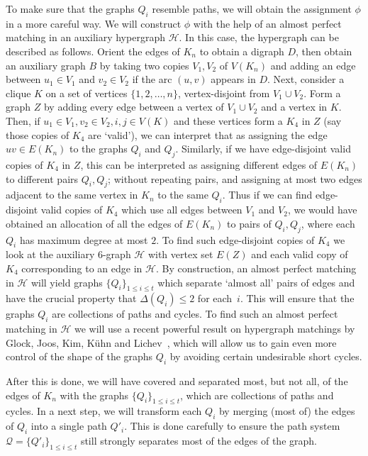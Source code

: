 \documentclass[a4paper, 11pt,reqno]{amsart}
\theoremstyle{plain}
\theoremstyle{definition}
\numberwithin{equation}{section}
\begin{document}
To make sure that the graphs $Q_i$ resemble paths, we will obtain the
assignment $\phi$ in a more careful way.  We will construct $\phi$
with the help of an almost perfect matching in an auxiliary hypergraph
$\mathcal{H}$.  In this case, the hypergraph can be described as
follows.  Orient the edges of $K_n$ to obtain a digraph $D$, then
obtain an auxiliary graph $B$ by taking two copies $V_1, V_2$ of
$V(K_n)$ and adding an edge between $u_1 \in V_1$ and $v_2 \in V_2$ if
the arc $(u,v)$ appears in $D$.
Next, consider a clique $K$ on a set of vertices $\{1, 2, \dotsc,
n\}$, vertex-disjoint from $V_1 \cup V_2$.  Form a graph $Z$ by adding
every edge between a vertex of $V_1 \cup V_2$ and a vertex in $K$.
Then, if $u_1 \in V_1, v_2 \in V_2, i, j \in V(K)$ and these vertices
form a $K_4$ in $Z$ (say those copies of $K_4$ are `valid'), we can
interpret that as assigning the edge $uv \in E(K_n)$ to the graphs
$Q_i$ and $Q_j$.  Similarly, if we have edge-disjoint valid copies of
$K_4$ in $Z$, this can be interpreted as assigning different edges of
$E(K_n)$ to different pairs $Q_i, Q_j$; without repeating pairs, and
assigning at most two edges adjacent to the same vertex in $K_n$ to
the same $Q_i$.  Thus if we can find edge-disjoint valid copies of
$K_4$ which use all edges between $V_1$ and $V_2$, we would have
obtained an allocation of all the edges of $E(K_n)$ to pairs of $Q_i,
Q_j$, where each $Q_i$ has maximum degree at most $2$.  To find such
edge-disjoint copies of $K_4$ we look at the auxiliary $6$-graph
$\mathcal{H}$ with vertex set $E(Z)$ and each valid copy of $K_4$
corresponding to an edge in $\mathcal{H}$.  By construction, an almost
perfect matching in $\mathcal{H}$ will yield graphs $\{Q_i\}_{1 \leq i
  \leq t}$ which separate `almost all' pairs of edges and have the
crucial property that $\Delta(Q_i) \leq 2$ for each~$i$.  This will
ensure that the graphs $Q_i$ are collections of paths and cycles.  To
find such an almost perfect matching in $\mathcal{H}$ we will use a
recent powerful result on hypergraph matchings by Glock, Joos, Kim,
Kühn and Lichev~\cite{GJKKL2022}, which will allow us to gain even
more control of the shape of the graphs $Q_i$ by avoiding certain
undesirable short cycles.

After this is done, we will have covered and separated most, but not
all, of the edges of $K_n$ with the graphs $\{Q_i\}_{1 \leq i \leq t}$, which are collections of
paths and cycles.  In a next step, we will transform each $Q_i$ by merging (most of) the edges of $Q_i$ into a single path
$Q'_i$.  This is done carefully to ensure the path system $\mathcal{Q}
= \{Q'_i\}_{1 \leq i \leq t}$ still strongly separates most of the
edges of the graph.
\end{document}
